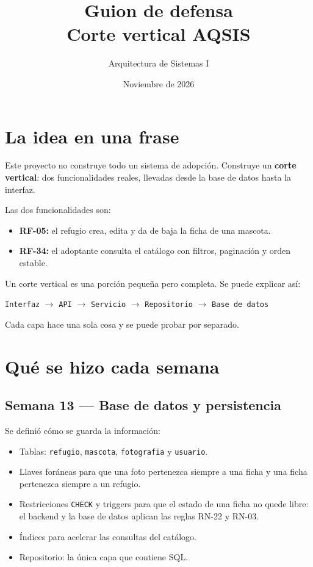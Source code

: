\documentclass[11pt,a4paper]{article}
\title{\textbf{Guion de defensa}\\Corte vertical AQSIS}
\author{Arquitectura de Sistemas I}
\date{Noviembre de 2026}
\newcommand{\code}[1]{\texttt{#1}}
\newcommand{\rf}[1]{\textbf{#1}}
\begin{document}
\maketitle

\section{La idea en una frase}

Este proyecto no construye todo un sistema de adopción. Construye un
\textbf{corte vertical}: dos funcionalidades reales, llevadas desde la base de
datos hasta la interfaz.

Las dos funcionalidades son:

\begin{itemize}[leftmargin=*]
  \item \rf{RF-05:} el refugio crea, edita y da de baja la ficha de una mascota.
  \item \rf{RF-34:} el adoptante consulta el catálogo con filtros, paginación y
    orden estable.
\end{itemize}

Un corte vertical es una porción pequeña pero completa. Se puede explicar así:

\begin{center}
  \code{Interfaz} $\rightarrow$ \code{API} $\rightarrow$ \code{Servicio}
  $\rightarrow$ \code{Repositorio} $\rightarrow$ \code{Base de datos}
\end{center}

Cada capa hace una sola cosa y se puede probar por separado.

\section{Qué se hizo cada semana}

\subsection{Semana 13 --- Base de datos y persistencia}

Se definió cómo se guarda la información:

\begin{itemize}[leftmargin=*]
  \item Tablas: \code{refugio}, \code{mascota}, \code{fotografia} y
    \code{usuario}.
  \item Llaves foráneas para que una foto pertenezca siempre a una ficha y una
    ficha pertenezca siempre a un refugio.
  \item Restricciones \code{CHECK} y triggers para que el estado de una ficha
    no quede libre: el backend y la base de datos aplican las reglas RN-22 y
    RN-03.
  \item Índices para acelerar las consultas del catálogo.
  \item Repositorio: la única capa que contiene SQL.
\end{itemize}
\end{document}
